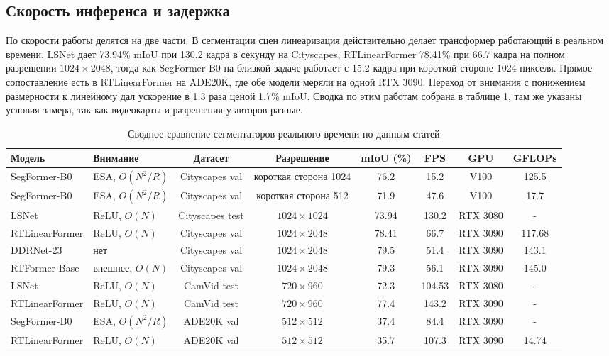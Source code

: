 \documentclass[areasetadvanced]{scrartcl}
\begin{document}
	\subsection{Скорость инференса и задержка}
		По скорости работы делятся на две части. В сегментации сцен линеаризация действительно делает трансформер работающий в реальном времени.
		LSNet \cite{lsnet} дает 73.94\% mIoU при 130.2 кадра в секунду на Cityscapes, RTLinearFormer \cite{rtlinearformer} 78.41\% при 66.7 кадра на
		полном разрешении $1024 \times 2048$, тогда как SegFormer-B0 \cite{segformer} на близкой задаче работает с 15.2 кадра при короткой стороне 1024
		пикселя. Прямое сопоставление есть в RTLinearFormer на ADE20K, где обе модели меряли на одной RTX 3090. Переход от
		внимания с понижением размерности к линейному дал ускорение в 1.3 раза ценой 1.7\% mIoU. Сводка по этим работам собрана в
		таблице \ref{tab:rtcompare}, там же указаны условия замера, так как видеокарты и разрешения у авторов разные.

		\begin{table}[H]
			\centering
			\footnotesize
			\caption{Сводное сравнение сегментаторов реального времени по данным статей \cite{segformer, lsnet, rtlinearformer}}
			\label{tab:rtcompare}
			\begin{adjustbox}{max width=\linewidth}
			\begin{tabular}{llcccccc}
				\toprule
				Модель & Внимание & Датасет & Разрешение & mIoU (\%) & FPS & GPU & GFLOPs \\
				\midrule
				SegFormer-B0 & ESA, $O(N^2/R)$ & Cityscapes val & короткая сторона 1024 & 76.2 & 15.2 & V100 & 125.5 \\
				SegFormer-B0 & ESA, $O(N^2/R)$ & Cityscapes val & короткая сторона 512 & 71.9 & 47.6 & V100 & 17.7 \\
				LSNet & ReLU, $O(N)$ & Cityscapes test & $1024 \times 1024$ & 73.94 & 130.2 & RTX 3080 & - \\
				RTLinearFormer & ReLU, $O(N)$ & Cityscapes val & $1024 \times 2048$ & 78.41 & 66.7 & RTX 3090 & 117.68 \\
				DDRNet-23 & нет & Cityscapes val & $1024 \times 2048$ & 79.5 & 51.4 & RTX 3090 & 143.1 \\
				RTFormer-Base & внешнее, $O(N)$ & Cityscapes val & $1024 \times 2048$ & 79.3 & 56.1 & RTX 3090 & 145.0 \\
				\midrule
				LSNet & ReLU, $O(N)$ & CamVid test & $720 \times 960$ & 72.3 & 104.53 & RTX 3080 & - \\
				RTLinearFormer & ReLU, $O(N)$ & CamVid test & $720 \times 960$ & 77.4 & 143.2 & RTX 3090 & - \\
				\midrule
				SegFormer-B0 & ESA, $O(N^2/R)$ & ADE20K val & $512 \times 512$ & 37.4 & 84.4 & RTX 3090 & - \\
				RTLinearFormer & ReLU, $O(N)$ & ADE20K val & $512 \times 512$ & 35.7 & 107.3 & RTX 3090 & 14.74 \\
				\bottomrule
			\end{tabular}
			\end{adjustbox}
		\end{table}
\end{document}
